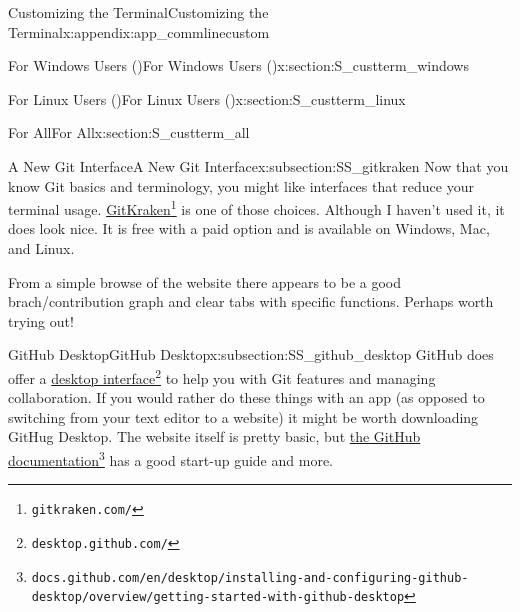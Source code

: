 \documentclass[oneside,10pt,]{book}
\begin{document}
\begin{appendixptx}{Customizing the Terminal}{}{Customizing the Terminal}{}{}{x:appendix:app_commlinecustom}
\typeout{************************************************}
%
\begin{sectionptx}{For Windows Users (\textasteriskcentered{})}{}{For Windows Users (\textasteriskcentered{})}{}{}{x:section:S_custterm_windows}
%
\end{sectionptx}
%
%
\typeout{************************************************}
\typeout{************************************************}
%
\begin{sectionptx}{For Linux Users (\textasteriskcentered{})}{}{For Linux Users (\textasteriskcentered{})}{}{}{x:section:S_custterm_linux}
%
\end{sectionptx}
%
%
\typeout{************************************************}
\typeout{************************************************}
%
\begin{sectionptx}{For All}{}{For All}{}{}{x:section:S_custterm_all}
%
%
\typeout{************************************************}
\typeout{************************************************}
%
\begin{subsectionptx}{A New Git Interface}{}{A New Git Interface}{}{}{x:subsection:SS_gitkraken}
%
%
Now that you know Git basics and terminology, you might like interfaces that reduce your terminal usage. \href{https://www.gitkraken.com/}{GitKraken}\footnote{\nolinkurl{gitkraken.com/}\label{g:fn:idp616910776}} is one of those choices. Although I haven't used it, it does look nice. It is free with a paid option and is available on Windows, Mac, and Linux.%
\par
From a simple browse of the website there appears to be a good brach\slash{}contribution graph and clear tabs with specific functions. Perhaps worth trying out!%
\end{subsectionptx}
%
%
\typeout{************************************************}
\typeout{************************************************}
%
\begin{subsectionptx}{GitHub Desktop}{}{GitHub Desktop}{}{}{x:subsection:SS_github_desktop}
%
%
GitHub does offer a \href{https://desktop.github.com/}{desktop interface}\footnote{\nolinkurl{desktop.github.com/}\label{g:fn:idp616906552}} to help you with Git features and managing collaboration. If you would rather do these things with an app (as opposed to switching from your text editor to a website) it might be worth downloading GitHug Desktop. The website itself is pretty basic, but \href{https://docs.github.com/en/desktop/installing-and-configuring-github-desktop/overview/getting-started-with-github-desktop}{the GitHub documentation}\footnote{\nolinkurl{docs.github.com/en/desktop/installing-and-configuring-github-desktop/overview/getting-started-with-github-desktop}\label{g:fn:idp616911544}} has a good start-up guide and more.%

\end{subsectionptx}
\end{sectionptx}
\end{appendixptx}
\end{document}

